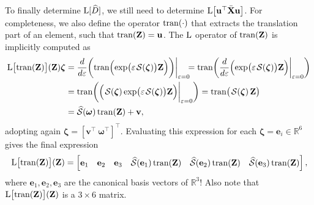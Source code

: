 To finally determine $\operatorname{L}[\widehat{D}]$, we still need to determine $\operatorname{L}\bigl[\mathbf{u}^\top\bar{\mathbf{X}}\mathbf{u}\bigr]$. For completeness, we also define the operator $\operatorname{tran}(\cdot)$ that extracts the translation part of an element, such that $\operatorname{tran}(\mathbf{Z})=\mathbf{u}$. The $\operatorname{L}$ operator of $\operatorname{tran}(\mathbf{Z})$ is implicitly computed as
\begin{align}
    \begin{split}
        \Lop\bigl[\trans(\mathbf{Z})\bigr](\mathbf{Z}) \boldsymbol{\zeta}&= \frac{d}{d\varepsilon}\biggl(\trans\Bigl(\exp\bigl(\varepsilon\SL[\boldsymbol{\zeta}]\bigr)\mathbf{Z}\Bigr)\biggr)\biggr|_{\varepsilon=0}\!\!\! = 
        \trans\biggl(\frac{d}{d\varepsilon}\Bigl(\exp\bigl(\varepsilon\SL[\boldsymbol{\zeta}]\bigr)\mathbf{Z}\Bigr)\biggr|_{\varepsilon=0}\biggr)\\
        &= \trans\biggl(\Bigl(\SL[\boldsymbol{\zeta}]\exp\bigl(\varepsilon\SL[\boldsymbol{\zeta}]\bigr)\mathbf{Z}\Bigr)\biggr|_{\varepsilon=0}\biggr)
        = \trans\bigl(\SL[\boldsymbol{\zeta}]\mathbf{Z}\bigr)\\
        &= \widehat{\mathcal{S}}(\boldsymbol{\omega})\trans(\mathbf{Z}) + \mathbf{v},
    \end{split}
\end{align}
adopting again $\boldsymbol{\zeta} = [\mathbf{v}^\top\ \boldsymbol{\omega}^\top]^\top$. Evaluating this expression for each $\boldsymbol{\zeta}=\mathbf{e}_i\in\mathbb{R}^6$ gives the final expression
\begin{align}
    \operatorname{L}\bigl[\operatorname{tran}(\mathbf{Z})\bigr](\mathbf{Z}) = \begin{bmatrix}
        \mathbf{e}_1 & \mathbf{e}_2 & \mathbf{e}_3 & \widehat{\mathcal{S}}(\mathbf{e}_1)\operatorname{tran}(\mathbf{Z}) & \widehat{\mathcal{S}}(\mathbf{e}_2)\operatorname{tran}(\mathbf{Z}) & \widehat{\mathcal{S}}(\mathbf{e}_3)\operatorname{tran}(\mathbf{Z})
    \end{bmatrix},
\end{align}
where ${\mathbf{e}_1,\mathbf{e}_2,\mathbf{e}_3}$ are the canonical basis vectors of $\mathbb{R}^3$! Also note that $\operatorname{L}\bigl[\operatorname{tran}(\mathbf{Z})\bigr](\mathbf{Z})$ is a $3\times 6$ matrix. 

